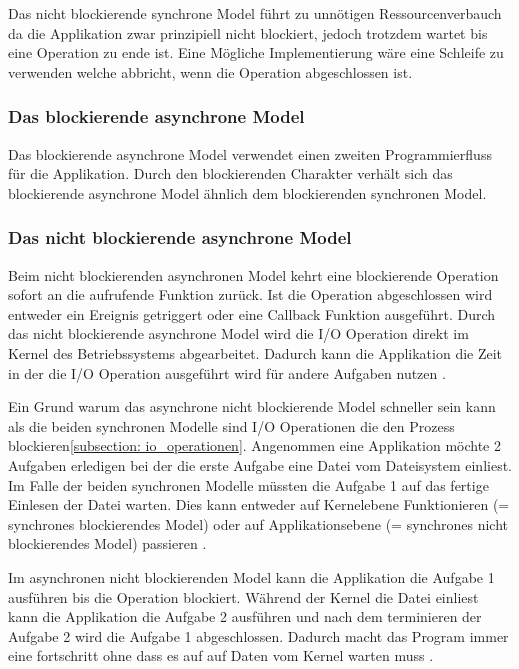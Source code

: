 Das nicht blockierende synchrone Model führt zu unnötigen Ressourcenverbauch da die Applikation zwar prinzipiell nicht blockiert, jedoch trotzdem wartet bis eine Operation zu ende ist. Eine Mögliche Implementierung wäre eine Schleife zu verwenden welche abbricht, wenn die Operation abgeschlossen ist.\cite[p. 48]{Erb2012}

\subsubsection{Das blockierende asynchrone Model}

Das blockierende asynchrone Model verwendet einen zweiten Programmierfluss für die Applikation. Durch den blockierenden Charakter verhält sich das blockierende asynchrone Model ähnlich dem blockierenden synchronen Model. 

\subsubsection{Das nicht blockierende asynchrone Model}
Beim nicht blockierenden asynchronen Model kehrt eine blockierende Operation sofort an die aufrufende Funktion zurück. Ist die Operation abgeschlossen wird entweder ein Ereignis getriggert oder eine Callback Funktion ausgeführt. Durch das nicht blockierende asynchrone Model wird die I/O Operation direkt im Kernel des Betriebssystems abgearbeitet. Dadurch kann die Applikation die Zeit in der die I/O Operation ausgeführt wird für andere Aufgaben nutzen \cite[p. 48]{Erb2012}.

Ein Grund warum das asynchrone nicht blockierende Model schneller sein kann als die beiden synchronen Modelle sind I/O Operationen die den Prozess blockieren\ref{subsection: io_operationen}. Angenommen eine Applikation möchte 2 Aufgaben erledigen bei der die erste Aufgabe eine Datei vom Dateisystem einliest. Im Falle der beiden synchronen Modelle müssten die Aufgabe 1 auf das fertige Einlesen der Datei warten. Dies kann entweder auf Kernelebene Funktionieren (= synchrones blockierendes Model) oder auf Applikationsebene (= synchrones nicht blockierendes Model) passieren \cite[]{Pet2015}. 

Im asynchronen nicht blockierenden Model kann die Applikation die Aufgabe 1 ausführen bis die Operation blockiert. Während der Kernel die Datei einliest kann die Applikation die Aufgabe 2 ausführen und nach dem terminieren der Aufgabe 2 wird die Aufgabe 1 abgeschlossen. Dadurch macht das Program immer eine fortschritt ohne dass es auf auf Daten vom Kernel warten muss \cite[]{Pet2015}.


